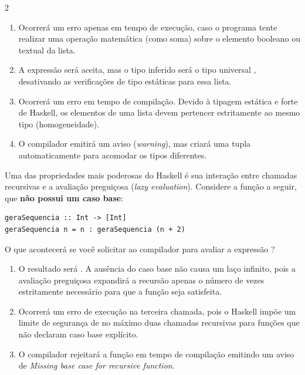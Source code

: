 \documentclass[a4paper,10pt,brazil]{article}
\begin{document}
\begin{multicols}{2}
\begin{enumerate}
  \item Ocorrerá um erro apenas em tempo de execução, caso o programa tente realizar uma operação matemática (como soma) sobre o elemento booleano ou textual da lista.

  \item A expressão será aceita, mas o tipo inferido será o tipo universal , desativando as verificações de tipo estáticas para essa lista.

  \item Ocorrerá um erro em tempo de compilação. Devido à tipagem estática e forte de Haskell, os elementos de uma lista devem pertencer estritamente ao mesmo tipo (homogeneidade).

  \item O compilador emitirá um aviso (\emph{warning}), mas criará uma tupla automaticamente para acomodar os tipos diferentes.


\end{enumerate}

Uma das propriedades mais poderosas do Haskell é sua interação entre chamadas recursivas e a avaliação preguiçosa (\emph{lazy evaluation}). Considere a função a seguir, que \textbf{não possui um caso base}:

\begin{verbatim}
geraSequencia :: Int -> [Int]
geraSequencia n = n : geraSequencia (n + 2)
\end{verbatim}

O que acontecerá se você solicitar ao compilador para avaliar a expressão ?

\begin{enumerate}
  \item O resultado será \haskellinline{[10, 12, 14]}. A ausência do caso base não causa um laço infinito, pois a avaliação preguiçosa expandirá a recursão apenas o número de vezes estritamente necessário para que a função  seja satisfeita.

  \item Ocorrerá um erro de execução na terceira chamada, pois o Haskell impõe um limite de segurança de no máximo duas chamadas recursivas para funções que não declaram caso base explícito.
  \item O compilador rejeitará a função  em tempo de compilação emitindo um aviso de \emph{Missing base case for recursive function}.


\end{enumerate}
\end{multicols}
\end{document}
